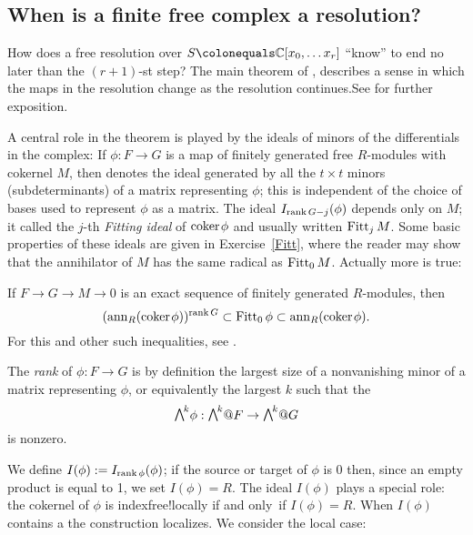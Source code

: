 \subsection*{When is a finite free complex a resolution?}
How does a free resolution over $S \colonequals  \CC[x_0, \dots x_r]$
``know'' to end no later than the $(r+1)$-st step?
The main theorem of \cite{WMACE}, describes a sense in which the maps in the resolution
change as the resolution continues.See \cite[Theorem 20.9]{Eisenbud1995}
for further exposition.

A central role in the theorem is played by the ideals of minors of the
differentials in the complex: If $\phi: F\to G$ is a map of finitely
generated free $R$-modules with cokernel $M$, then
denotes the ideal generated by all the $t\times t$ minors
(subdeterminants) of a matrix representing $\phi$; this is independent
of the choice of bases used to represent $\phi$ as a matrix.
The ideal $I_{\operatorname{rank} G -j}(\phi)$ depends only on $M$; it called the
$j$-th \emph{Fitting ideal} of ${\rm{coker}\kern1pt} \phi$  and
%
%
usually written $\operatorname{Fitt}_{j} M$. Some basic properties of these ideals are
given in Exercise~\ref{Fitt}, where the reader may show that the
annihilator of $M$ has the
same radical as $\operatorname{Fitt}_{0} M$. Actually more is true:

\begin{fact}
If $F\to G \to M \to 0$ is an exact sequence of finitely generated
$R$-modules, then
$$
({\rm{ann}}_{R}({\rm{coker}\kern1pt} \phi))^{\operatorname{rank} G}\subset \operatorname{Fitt}_{0}\phi \subset
{\rm{ann}}_{R}({\rm{coker}\kern1pt} \phi).
$$
For this and other such inequalities, see \cite{MR476736}.
\end{fact}

The \emph{rank} of $\phi: F\to G$ is by definition the largest size of a nonvanishing
%
minor of a matrix representing $\phi$,
or equivalently the largest $k$ such that the
%
$$\mwedge^{k}\phi : \mwedge^{k}@F \to \mwedge^{k}@G$$
is nonzero. 

We define
$I(\phi): = I_{\operatorname{rank} \phi}(\phi)$; if the source or target of $\phi$ is 0 then, since an empty
product is equal to 1,
we set $I(\phi) = R$.  The ideal $I(\phi)$ plays a special role: the cokernel
of $\phi$
is  
index{free!locally}
 if and only~if $I(\phi) = R$. When
$I(\phi)$ contains a 
%
 the construction localizes. We consider the local case:

